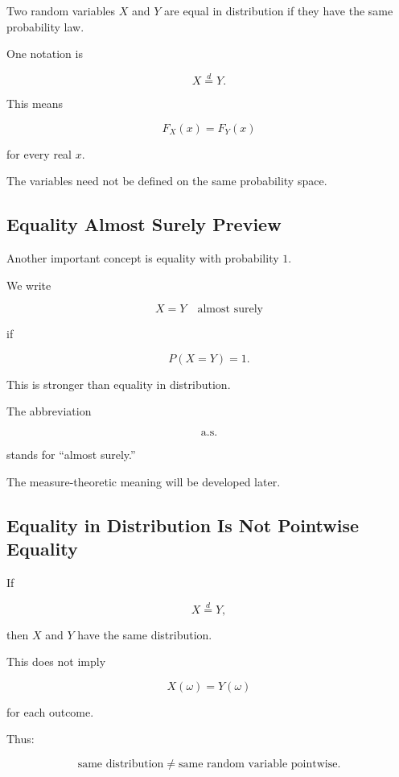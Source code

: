 Two random variables \(X\) and \(Y\) are equal in distribution if they
have the same probability law.

One notation is

\[
\boxed{
X\overset{d}{=}Y.
}
\]

This means

\[
\boxed{
F_X(x)=F_Y(x)
}
\]

for every real \(x\).

The variables need not be defined on the same probability space.

\subsection{Equality Almost Surely Preview}
\label{subsec:equality-almost-surely-preview}

Another important concept is equality with probability \(1\).

We write

\[
\boxed{
X=Y
\quad\text{almost surely}
}
\]

if

\[
\boxed{
P(X=Y)=1.
}
\]

This is stronger than equality in distribution.

The abbreviation

\[
\text{a.s.}
\]

stands for ``almost surely.''

The measure-theoretic meaning will be developed later.

\subsection{Equality in Distribution Is Not Pointwise Equality}
\label{subsec:distribution-not-pointwise}

If

\[
X\overset{d}{=}Y,
\]

then \(X\) and \(Y\) have the same distribution.

This does not imply

\[
X(\omega)=Y(\omega)
\]

for each outcome.

Thus:

\[
\boxed{
\text{same distribution}
\neq
\text{same random variable pointwise}.
}
\]

